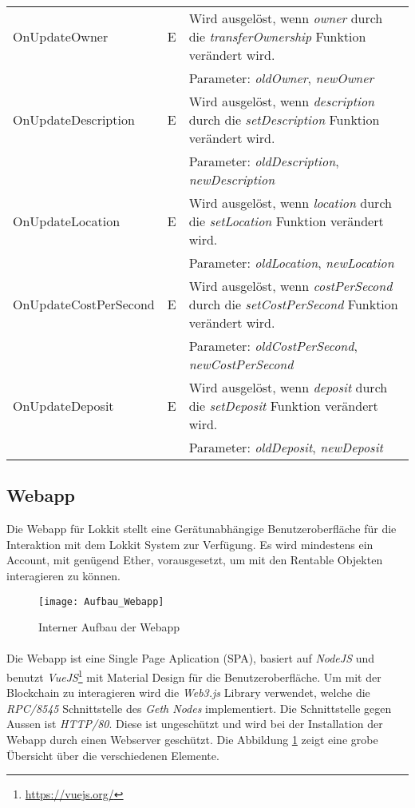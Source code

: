 \begin{longtable}{@{}lcL{9cm}@{}}
OnUpdateOwner              & E   & Wird ausgelöst, wenn \emph{owner} durch die \emph{transferOwnership} Funktion verändert wird.\\ & & Parameter: \emph{oldOwner}, \emph{newOwner} \\ \midrule
OnUpdateDescription              & E   & Wird ausgelöst, wenn \emph{description} durch die \emph{setDescription} Funktion verändert wird.\\ & & Parameter: \emph{oldDescription}, \emph{newDescription} \\ \midrule
OnUpdateLocation              & E   & Wird ausgelöst, wenn \emph{location} durch die \emph{setLocation} Funktion verändert wird.\\ & & Parameter: \emph{oldLocation}, \emph{newLocation} \\ \midrule
OnUpdateCostPerSecond              & E   & Wird ausgelöst, wenn \emph{costPerSecond} durch die \emph{setCostPerSecond} Funktion verändert wird.\\ & & Parameter: \emph{oldCostPerSecond}, \emph{newCostPerSecond} \\ \midrule
OnUpdateDeposit              & E   & Wird ausgelöst, wenn \emph{deposit} durch die \emph{setDeposit} Funktion verändert wird.\\ & & Parameter: \emph{oldDeposit}, \emph{newDeposit} \\
\bottomrule
\end{longtable}


\subsection{Webapp}
\label{sys_subsec:Webapp}

Die Webapp für Lokkit stellt eine Gerätunabhängige Benutzeroberfläche für die Interaktion mit dem Lokkit System zur Verfügung. Es wird mindestens ein Account, mit genügend Ether, vorausgesetzt, um mit den Rentable Objekten interagieren zu können.

\begin{figure}[H]
\centering
\texttt{[image: Aufbau\_Webapp]}
\caption{Interner Aufbau der Webapp}
\label{fig:Aufbau der Webapp}
\end{figure}

\paragraph{}
Die Webapp ist eine Single Page Aplication (SPA), basiert auf \emph{NodeJS} und benutzt \emph{VueJS}\footnote{\url{https://vuejs.org/}} mit Material Design für die Benutzeroberfläche. Um mit der Blockchain zu interagieren wird die \emph{Web3.js} Library verwendet, welche die \emph{RPC/8545} Schnittstelle des \emph{Geth Nodes} implementiert. 
Die Schnittstelle gegen Aussen ist \emph{HTTP/80}. Diese ist ungeschützt und wird bei der Installation der Webapp durch einen Webserver geschützt. Die Abbildung \ref{fig:Aufbau der Webapp} zeigt eine grobe Übersicht über die verschiedenen Elemente.


